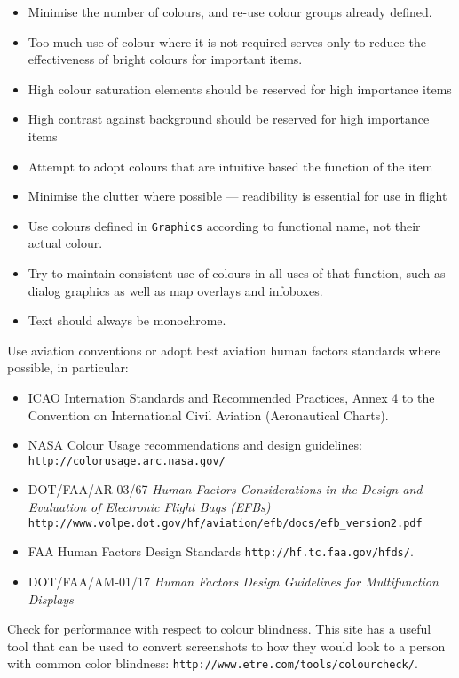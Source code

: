 \documentclass[a4paper,12pt]{refrep}
\begin{document}
\begin{itemize}
\item Minimise the number of colours, and re-use colour groups already defined.
\item Too much use of colour where it is not required serves only to reduce the effectiveness of bright colours for important items.
\item High colour saturation elements should be reserved for high importance items
\item High contrast against background should be reserved for high importance items
\item Attempt to adopt colours that are intuitive based the function of the item
\item Minimise the clutter where possible --- readibility is essential for use in flight
\item Use colours defined in \verb|Graphics| according to functional name, not their actual colour.
\item Try to maintain consistent use of colours in all uses of that function, such as dialog graphics as well as map overlays and infoboxes.
\item Text should always be monochrome.
\end{itemize}

Use aviation conventions or adopt best aviation human factors
standards where possible, in particular:
\begin{itemize}
\item ICAO Internation Standards and Recommended Practices, Annex 4 to the Convention on International Civil Aviation (Aeronautical Charts).
\item NASA Colour Usage recommendations and design guidelines: \verb|http://colorusage.arc.nasa.gov/|
\item DOT/FAA/AR-03/67 {\em Human Factors Considerations in the Design and Evaluation of Electronic Flight Bags (EFBs)} \verb|http://www.volpe.dot.gov/hf/aviation/efb/docs/efb_version2.pdf|
\item FAA Human Factors Design Standards \verb|http://hf.tc.faa.gov/hfds/|.
\item DOT/FAA/AM-01/17 {\em Human Factors Design Guidelines for Multifunction Displays}
\end{itemize}

Check for performance with respect to colour blindness.
This site has a useful tool that can be used to convert screenshots
to how they would look to a person with common color blindness:
\verb|http://www.etre.com/tools/colourcheck/|.
\end{document}

